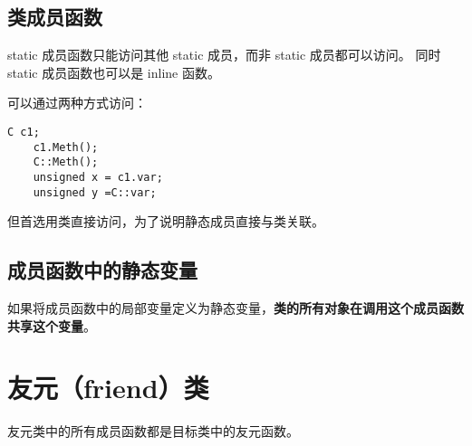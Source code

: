 \subsection{类成员函数}

static 成员函数只能访问其他 static 成员，而非 static 成员都可以访问。
同时 static 成员函数也可以是 inline 函数。

可以通过两种方式访问：
\begin{lstlisting}[frame=shadowbox]
    C c1;
    c1.Meth();
    C::Meth();
    unsigned x = c1.var;
    unsigned y =C::var;
\end{lstlisting}

但首选用类直接访问，为了说明静态成员直接与类关联。

\subsection{成员函数中的静态变量}

如果将成员函数中的局部变量定义为静态变量，\textbf{类的所有对象在调用这个成员函数共享这个变量}。


\section{友元（friend）类}

友元类中的所有成员函数都是目标类中的友元函数。

\newpage